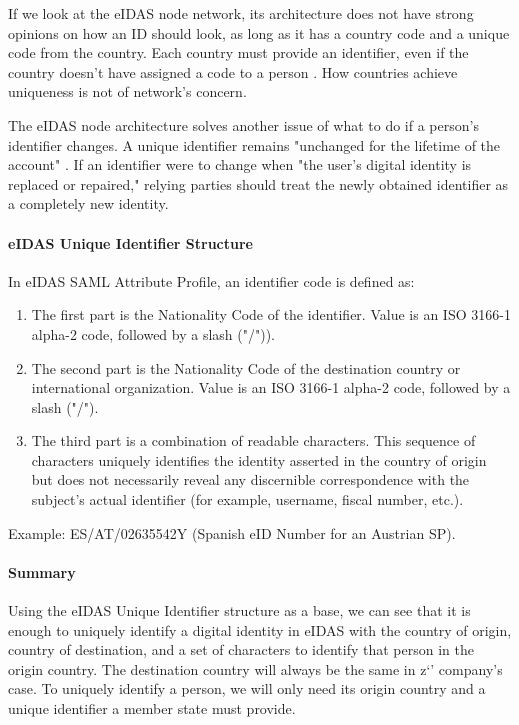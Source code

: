 If we look at the eIDAS node network, its architecture does not have strong opinions on how an ID should look, as long as it has a country code and a unique code from the country. Each country must provide an identifier, even if the country doesn't have assigned a code to a person \cite{eidas-saml}. How countries achieve uniqueness is not of network's concern.

The eIDAS node architecture solves another issue of what to do if a person's identifier changes. A unique identifier remains "unchanged for the lifetime of the account" \cite{eidas-saml}. If an identifier were to change when "the user's digital identity is replaced or repaired," relying parties should treat the newly obtained identifier as a completely new identity.

\paragraph{eIDAS Unique Identifier Structure} In eIDAS SAML Attribute Profile, an identifier code is defined as:
\begin{enumerate}
  \item The first part is the Nationality Code of the identifier. Value is an ISO 3166-1 alpha-2 code, followed by a slash ("/")).
  \item The second part is the Nationality Code of the destination country or international organization. Value is an ISO 3166-1 alpha-2 code, followed by a slash ("/").
  \item The third part is a combination of readable characters. This sequence of characters uniquely identifies the identity asserted in the country of origin but does not necessarily reveal any discernible correspondence with the subject's actual identifier (for example, username, fiscal number, etc.).
\end{enumerate}

Example: ES/AT/02635542Y (Spanish eID Number for an Austrian SP).

\paragraph{Summary} Using the eIDAS Unique Identifier structure as a base, we can see that it is enough to uniquely identify a digital identity in eIDAS with the country of origin, country of destination, and a set of characters to identify that person in the origin country. The destination country will always be the same in z`' company's case. To uniquely identify a person, we will only need its origin country and a unique identifier a member state must provide.


